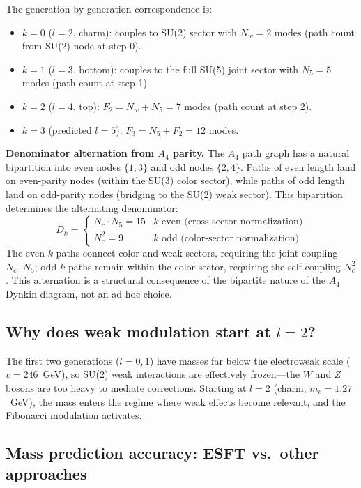 ﻿\documentclass[twocolumn,preprintnumbers,amsmath,amssymb,prd]{revtex4-2}
\begin{document}
The generation-by-generation correspondence is:
\begin{itemize}
\item $k=0$ ($l=2$, charm): couples to SU(2) sector with $N_w = 2$ modes (path count from SU(2) node at step 0).
\item $k=1$ ($l=3$, bottom): couples to the full SU(5) joint sector with $N_5 = 5$ modes (path count at step 1).
\item $k=2$ ($l=4$, top): $F_2 = N_w + N_5 = 7$ modes (path count at step 2).
\item $k=3$ (predicted $l=5$): $F_3 = N_5 + F_2 = 12$ modes.
\end{itemize}

\textbf{Denominator alternation from $A_4$ parity.}
The $A_4$ path graph has a natural bipartition into even nodes $\{1, 3\}$ and odd nodes $\{2, 4\}$. Paths of even length land on even-parity nodes (within the SU(3) color sector), while paths of odd length land on odd-parity nodes (bridging to the SU(2) weak sector). This bipartition determines the alternating denominator:
\begin{equation}
D_k = \begin{cases}
N_c \cdot N_5 = 15 & k \text{ even (cross-sector normalization)} \\
N_c^2 = 9 & k \text{ odd (color-sector normalization)}
\end{cases}
\end{equation}
The even-$k$ paths connect color and weak sectors, requiring the joint coupling $N_c \cdot N_5$; odd-$k$ paths remain within the color sector, requiring the self-coupling $N_c^2$. This alternation is a structural consequence of the bipartite nature of the $A_4$ Dynkin diagram, not an ad hoc choice.

\subsection{Why does weak modulation start at $l=2$?}

The first two generations ($l=0,1$) have masses far below the electroweak scale ($v = 246$~GeV), so SU(2) weak interactions are effectively frozen---the $W$ and $Z$ bosons are too heavy to mediate corrections. Starting at $l=2$ (charm, $m_c = 1.27$~GeV), the mass enters the regime where weak effects become relevant, and the Fibonacci modulation activates.

\subsection{Mass prediction accuracy: ESFT vs.\ other approaches}
\end{document}
